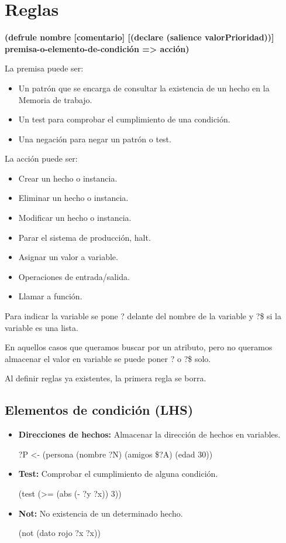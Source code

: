 \documentclass[12pt, twoside, openright]{report} %
\begin{document}
\section{Reglas}
\textbf{(defrule nombre [comentario] [(declare (salience valorPrioridad))] premisa-o-elemento-de-condición => acción)}

La premisa puede ser:
\begin{itemize}
	\item Un patrón que se encarga de consultar la existencia de un hecho en la Memoria de trabajo.
	\item Un test para comprobar el cumplimiento de una condición.
	\item Una negación para negar un patrón o test.
\end{itemize}

La acción puede ser:
\begin{itemize}
	\item Crear un hecho o instancia.
	\item Eliminar un hecho o instancia.
	\item Modificar un hecho o instancia.
	\item Parar el sistema de producción, halt.
	\item Asignar un valor a variable.
	\item Operaciones de entrada/salida.
	\item Llamar a función.
\end{itemize}

Para indicar la variable se pone ? delante del nombre de la variable y ?\$ si la variable es una lista.

En aquellos casos que queramos buscar por un atributo, pero no queramos almacenar el valor en variable se puede poner ? o ?\$ solo.

Al definir reglas ya existentes, la primera regla se borra.
\subsection{Elementos de condición (LHS)}
\begin{itemize}
	\item \textbf{Direcciones de hechos:} Almacenar la dirección de hechos en variables.
	      
	      ?P <- (persona (nombre ?N) (amigos \$?A) (edad 30))
	\item \textbf{Test:} Comprobar el cumplimiento de alguna condición.
	      
	      (test (>= (abs (- ?y ?x)) 3))
	\item \textbf{Not:} No existencia de un determinado hecho.
	      
	      (not (dato rojo ?x ?x))
\end{itemize}
\end{document}
